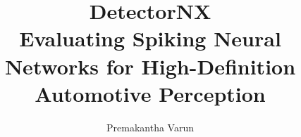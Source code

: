 \documentclass[12pt,BSc,wordcount,twoside,anon]{muthesis}
\begin{document}

\title{\textbf{DetectorNX} \\[0.4em] Evaluating Spiking Neural Networks for High-Definition Automotive Perception}
\author{Premakantha Varun}

\beforeabstract



\afterabstract


\afterpreface


\printglossary[type=\acronymtype, title=List of Abbreviations]







\printbibliography



\appendix

\end{document}
